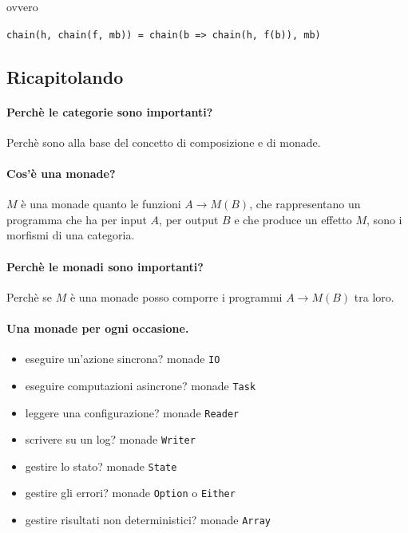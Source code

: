 \documentclass[12pt]{article}
\begin{document}
ovvero

\begin{center}
\texttt{chain(h, chain(f, mb)) = chain(b => chain(h, f(b)), mb)}
\end{center}

\subsection{Ricapitolando}

\paragraph{Perchè le categorie sono importanti?}

Perchè sono alla base del concetto di composizione e di monade.

\paragraph{Cos'è una monade?}

$M$ è una monade quanto le funzioni $A \rightarrow M(B)$, che rappresentano un programma che ha per input $A$, per output $B$
e che produce un effetto $M$, sono i morfismi di una categoria.

\paragraph{Perchè le monadi sono importanti?}

Perchè se $M$ è una monade posso comporre i programmi $A \rightarrow M(B)$ tra loro.

\paragraph{Una monade per ogni occasione.}

\begin{itemize}
  \item eseguire un'azione sincrona? monade \texttt{IO}
  \item eseguire computazioni asincrone? monade \texttt{Task}
  \item leggere una configurazione? monade \texttt{Reader}
  \item scrivere su un log? monade \texttt{Writer}
  \item gestire lo stato? monade \texttt{State}
  \item gestire gli errori? monade \texttt{Option} o \texttt{Either}
  \item gestire risultati non deterministici? monade \texttt{Array}
\end{itemize}
\end{document}
